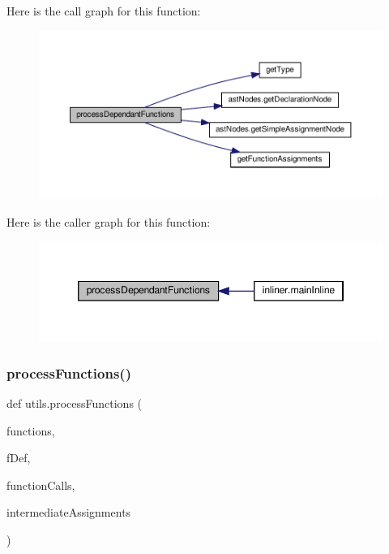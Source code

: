 Here is the call graph for this function\+:\nopagebreak
\begin{figure}[H]
\begin{center}
\leavevmode
\includegraphics[width=350pt]{namespaceutils_a6c1d5e886507ec0741fb0fce3f642c5b_cgraph}
\end{center}
\end{figure}
Here is the caller graph for this function\+:\nopagebreak
\begin{figure}[H]
\begin{center}
\leavevmode
\includegraphics[width=346pt]{namespaceutils_a6c1d5e886507ec0741fb0fce3f642c5b_icgraph}
\end{center}
\end{figure}
\mbox{\label{namespaceutils_a4934e690de4b9b81cb16a1df0dbd73b9}} 
\subsubsection{\texorpdfstring{process\+Functions()}{processFunctions()}}
{\footnotesize\ttfamily def utils.\+process\+Functions (\begin{DoxyParamCaption}\item[{}]{functions,  }\item[{}]{f\+Def,  }\item[{}]{function\+Calls,  }\item[{}]{intermediate\+Assignments }\end{DoxyParamCaption})}

